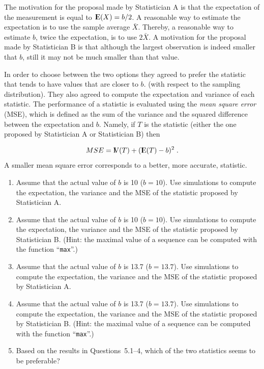 \documentclass[]{krantz}
\newcommand{\Expec}{{\rm I\kern-.3em E}}
\newcommand{\Var}{{\rm I\kern-.3em V}}
\theoremstyle{definition}
\theoremstyle{definition}
\theoremstyle{definition}
\theoremstyle{remark}
\begin{document}
The motivation for the proposal made by Statistician A is that the
expectation of the measurement is equal to \(\Expec(X) = b/2\). A
reasonable way to estimate the expectation is to use the sample average
\(\bar X\). Thereby, a reasonable way to estimate \(b\), twice the
expectation, is to use \(2 \bar X\). A motivation for the proposal made
by Statistician B is that although the largest observation is indeed
smaller that \(b\), still it may not be much smaller than that value.

In order to choose between the two options they agreed to prefer the
statistic that tends to have values that are closer to \(b\). (with
respect to the sampling distribution). They also agreed to compute the
expectation and variance of each statistic. The performance of a
statistic is evaluated using the \emph{mean square error} (MSE), which
is defined as the sum of the variance and the squared difference between
the expectation and \(b\). Namely, if \(T\) is the statistic (either the
one proposed by Statistician A or Statistician B) then

\[MSE = \Var(T) + (\Expec(T) - b)^2\;.\] A smaller mean square error
corresponds to a better, more accurate, statistic.

\begin{enumerate}
\def\labelenumi{\arabic{enumi}.}
\item
  Assume that the actual value of \(b\) is 10 (\(b=10\)). Use
  simulations to compute the expectation, the variance and the MSE of
  the statistic proposed by Statistician A.
\item
  Assume that the actual value of \(b\) is 10 (\(b=10\)). Use
  simulations to compute the expectation, the variance and the MSE of
  the statistic proposed by Statistician B. (Hint: the maximal value of
  a sequence can be computed with the function ``\texttt{max}''.)
\item
  Assume that the actual value of \(b\) is 13.7 (\(b=13.7\)). Use
  simulations to compute the expectation, the variance and the MSE of
  the statistic proposed by Statistician A.
\item
  Assume that the actual value of \(b\) is 13.7 (\(b=13.7\)). Use
  simulations to compute the expectation, the variance and the MSE of
  the statistic proposed by Statistician B. (Hint: the maximal value of
  a sequence can be computed with the function ``\texttt{max}''.)
\item
  Based on the results in Questions~5.1--4, which of the two statistics
  seems to be preferable?
\end{enumerate}
\end{document}
